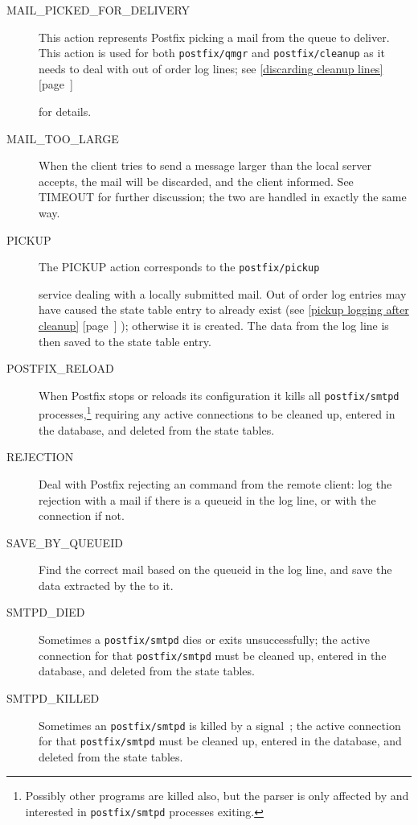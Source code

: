 \documentclass[a4paper,12pt,draft]{article}
\newcommand{\refwithpage}[1]{%
    \empty{}\ref{#1} [page~\pageref{#1}]%
}
\newcommand{\sectionref}[1]{%
    \textsection{}\refwithpage{#1}%
}
\newcommand{\daemon}[1]{%
    \texttt{postfix/#1}%
}
\begin{document}
\begin{description}
    \item [MAIL\_PICKED\_FOR\_DELIVERY] This action represents Postfix
        picking a mail from the queue to deliver. This action is used for
        both \daemon{qmgr} and \daemon{cleanup} as it needs to deal with
        out of order log lines; see \sectionref{discarding cleanup lines}
        for details.

    \item [MAIL\_TOO\_LARGE] When the client tries to send a message larger
        than the local server accepts, the mail will be discarded, and the
        client informed.  See TIMEOUT for further discussion; the two are
        handled in exactly the same way.

    \item [PICKUP] The PICKUP action corresponds to the \daemon{pickup}
        service dealing with a locally submitted mail.  Out of order log
        entries may have caused the state table entry to already exist (see
        \sectionref{pickup logging after cleanup}); otherwise it is
        created.  The data from the log line is then saved to the state
        table entry.

    \item [POSTFIX\_RELOAD] When Postfix stops or reloads its configuration
        it kills all \daemon{smtpd} processes,\footnote{Possibly other
        programs are killed also, but the parser is only affected by and
        interested in \daemon{smtpd} processes exiting.} requiring any
        active connections to be cleaned up, entered in the database, and
        deleted from the state tables.

    \item [REJECTION] Deal with Postfix rejecting an \SMTP{} command from
        the remote client: log the rejection with a mail if there is a
        queueid in the log line, or with the connection if not.

    \item [SAVE\_BY\_QUEUEID] Find the correct mail based on the queueid in
        the log line, and save the data extracted by the \regex{} to it.

    \item [SMTPD\_DIED] Sometimes a \daemon{smtpd} dies or exits
        unsuccessfully; the active connection for that \daemon{smtpd} must
        be cleaned up, entered in the database, and deleted from the state
        tables.

    \item [SMTPD\_KILLED] Sometimes an \daemon{smtpd} is killed by a
        signal~\cite{Wikipedia-unix-signals}; the active connection for
        that \daemon{smtpd} must be cleaned up, entered in the database,
        and deleted from the state tables.


\end{description}
\end{document}
